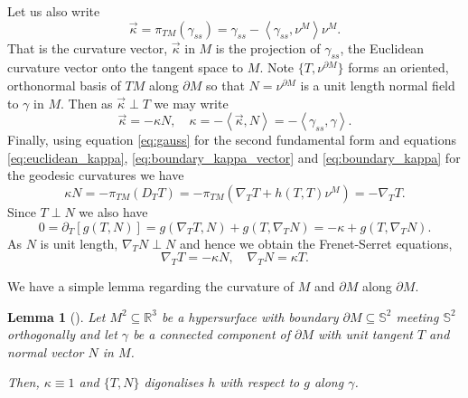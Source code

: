 \documentclass[10pt]{amsart}
\newcommand{\IP}[2]{\left< #1 , #2 \right>}
\newcommand{\R}{\ensuremath{\mathbb{R}}}
\renewcommand{\S}{\ensuremath{\mathbb{S}}}
\newtheorem{lem}[thm]{Lemma}
\theoremstyle{remark}
\begin{document}
Let us also write
\begin{equation}
\label{eq:boundary_kappa_vector}
\vec{\kappa} = \pi_{TM} (\gamma_{ss}) = \gamma_{ss} - \IP{\gamma_{ss}}{\nu^M} \nu^M.
\end{equation}
That is the curvature vector, \(\vec{\kappa}\) in \(M\) is the projection of \(\gamma_{ss}\), the Euclidean curvature vector onto the tangent space to \(M\). Note \(\{T, \nu^{\partial M}\}\) forms an oriented, orthonormal basis of \(TM\) along \(\partial M\) so that \(N = \nu^{\partial M}\) is a unit length normal field to \(\gamma\)  in \(M\). Then as \(\vec{\kappa} \perp T\) we may write 
\begin{equation}
\label{eq:boundary_kappa}
\vec{\kappa} = -\kappa N, \quad \kappa = -\IP{\vec{\kappa}}{N} = -\IP{\gamma_{ss}}{\gamma}.
\end{equation}
Finally, using equation \eqref{eq:gauss} for the second fundamental form and equations \eqref{eq:euclidean_kappa}, \eqref{eq:boundary_kappa_vector} and \eqref{eq:boundary_kappa} for the geodesic curvatures we have 
\[
\kappa N = -\pi_{TM} (D_T T) = -\pi_{TM} (\nabla_T T + h(T, T) \nu^M) = -\nabla_T T.
\]
Since \(T \perp N\) we also have
\[
0 = \partial_T [g(T, N)] = g(\nabla_T T, N) + g(T, \nabla_T N) = -\kappa + g(T, \nabla_T N).
\]
As \(N\) is unit length, \(\nabla_T N \perp N\) and hence we obtain the Frenet-Serret equations,
\begin{equation}
\label{eq:frenet_serret}
\nabla_T T = -\kappa N, \quad \nabla_T N = \kappa T.
\end{equation}

We have a simple lemma regarding the curvature of \(M\) and \(\partial M\) along \(\partial M\).

\begin{lem}[{\cite[Lemma 2]{ros1995stability}}]
\label{lem:boundary_curvature}
Let \(M^2 \subseteq \R^3\) be a hypersurface with boundary \(\partial M \subseteq \S^2\) meeting \(\S^2\) orthogonally and let \(\gamma\) be a connected component of \(\partial M\) with unit tangent \(T\) and normal vector \(N\) in \(M\).

Then, \(\kappa \equiv 1\) and \(\{T, N\}\) digonalises \(h\) with respect to \(g\) along \(\gamma\).
\end{lem}
\end{document}

